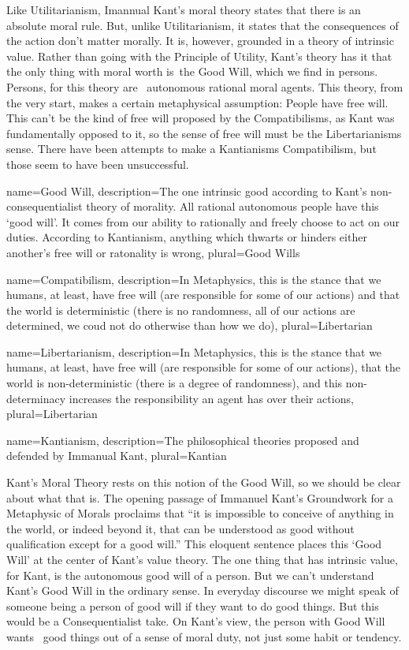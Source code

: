 Like Utilitarianism, Imannual Kant’s moral theory states that there is an absolute moral rule. But, unlike Utilitarianism, it states that the consequences of the action don't matter morally. It is, however, grounded in a theory of intrinsic value. Rather than going with the Principle of Utility, Kant's theory has it that the only thing with moral worth is the \gls{Good Will}, which we find in persons. Persons, for this theory are  autonomous rational moral agents. This theory, from the very start, makes a certain metaphysical assumption: People have free will. This can't be the kind of free will proposed by the \glspl{Compatibilism}, as Kant was fundamentally opposed to it, so the sense of free will must be the \glspl{Libertarianism} sense. There have been attempts to make a \glspl{Kantianism} Compatibilism, but those seem to have been unsuccessful.\autocite{Vilhauer1}

{
  name=Good Will,
  description={The one intrinsic good according to Kant's non-consequentialist theory of morality. All rational autonomous people have this `good will'. It comes from our ability to rationally and freely choose to act on our duties. According to Kantianism, anything which thwarts or hinders either another's free will or ratonality is wrong},
  plural=Good Wills
}

{
  name=Compatibilism,
  description={In Metaphysics, this is the stance that we humans, at least, have free will (are responsible for some of our actions) and that the world is deterministic (there is no randomness, all of our actions are determined, we coud not do otherwise than how we do)},
  plural=Libertarian
}


{
  name=Libertarianism,
  description={In Metaphysics, this is the stance that we humans, at least, have free will (are responsible for some of our actions), that the world is non-deterministic (there is a degree of randomness), and this non-determinacy increases the responsibility an agent has over their actions},
  plural=Libertarian
}

{
  name=Kantianism,
  description={The philosophical theories proposed and defended by Immanual Kant},
  plural=Kantian
}


Kant's Moral Theory rests on this notion of the Good Will, so we should be clear about what that is. The opening passage of Immanuel Kant’s Groundwork for a Metaphysic of Morals proclaims that “it is impossible to conceive of anything in the world, or indeed beyond it, that can be understood as good without qualification except for a good will.” This eloquent sentence places this `Good Will' at the center of Kant's value theory. The one thing that has intrinsic value, for Kant, is the autonomous good will of a person. But we can't understand Kant's Good Will in the ordinary sense. In everyday discourse we might speak of someone being a person of good will if they want to do good things. But this would be a Consequentialist take. On Kant’s view, the person with Good Will wants  good things out of a sense of moral duty, not just some habit or tendency.

